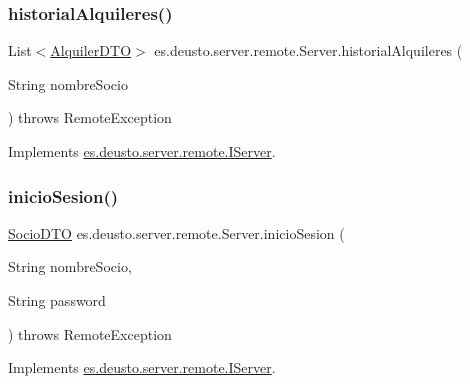 \subsubsection{\texorpdfstring{historialAlquileres()}{historialAlquileres()}}
{\footnotesize\ttfamily List$<$\mbox{\hyperlink{classes_1_1deusto_1_1server_1_1dto_1_1_alquiler_d_t_o}{Alquiler\+D\+TO}}$>$ es.\+deusto.\+server.\+remote.\+Server.\+historial\+Alquileres (\begin{DoxyParamCaption}\item[{String}]{nombre\+Socio }\end{DoxyParamCaption}) throws Remote\+Exception}



Implements \mbox{\hyperlink{interfacees_1_1deusto_1_1server_1_1remote_1_1_i_server_ab6d4eec966b0e54e1b82c037dee7da23}{es.\+deusto.\+server.\+remote.\+I\+Server}}.

\mbox{\label{classes_1_1deusto_1_1server_1_1remote_1_1_server_a9202d46c169e1920b585990f1adba486}} 
\subsubsection{\texorpdfstring{inicioSesion()}{inicioSesion()}}
{\footnotesize\ttfamily \mbox{\hyperlink{classes_1_1deusto_1_1server_1_1dto_1_1_socio_d_t_o}{Socio\+D\+TO}} es.\+deusto.\+server.\+remote.\+Server.\+inicio\+Sesion (\begin{DoxyParamCaption}\item[{String}]{nombre\+Socio,  }\item[{String}]{password }\end{DoxyParamCaption}) throws Remote\+Exception}



Implements \mbox{\hyperlink{interfacees_1_1deusto_1_1server_1_1remote_1_1_i_server_a0815847d37ff0d87f0c2bdd8202b48bb}{es.\+deusto.\+server.\+remote.\+I\+Server}}.

\mbox{\label{classes_1_1deusto_1_1server_1_1remote_1_1_server_ae4892ba5e855e921d156a4b49562424c}} 
